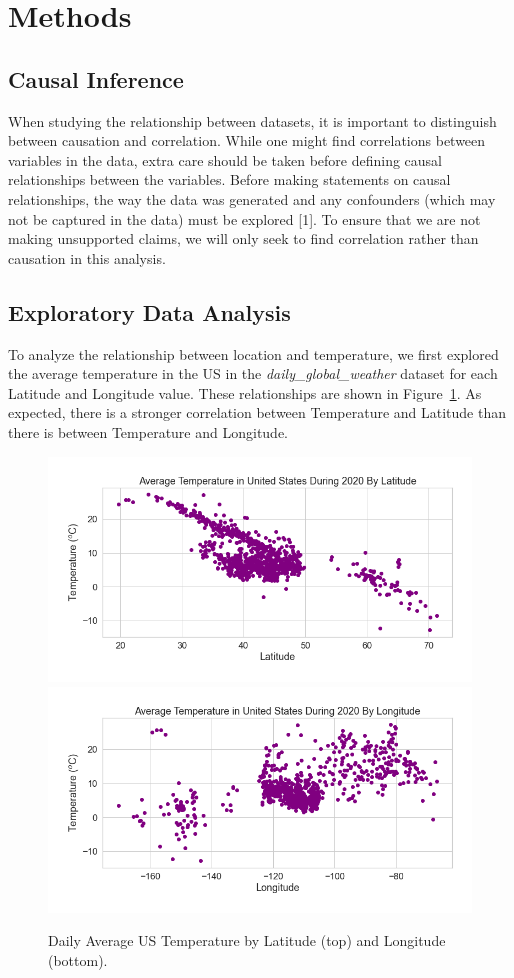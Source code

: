 \section{Methods}
\subsection{Causal Inference}
When studying the relationship between datasets, it is important to distinguish between causation and correlation. While one might find correlations between variables in the data, extra care should be taken before defining causal relationships between the variables. Before making statements on causal relationships, the way the data was generated and any confounders (which may not be captured in the data) must be explored [1]. To ensure that we are not making unsupported claims, we will only seek to find correlation rather than causation in this analysis. 

\subsection{Exploratory Data Analysis}
To analyze the relationship between location and temperature, we first explored the average temperature in the US in the \textit{daily\_global\_weather} dataset for each Latitude and Longitude value. These relationships are shown in Figure~\ref{fig:latlon_temp}. As expected, there is a stronger correlation between Temperature and Latitude than there is between Temperature and Longitude.
\begin{figure}
    \centering
    \includegraphics[width=\columnwidth]{figures/USLatTemp.png}
    \includegraphics[width=\columnwidth]{figures/USLonTemp.png}
    \caption{Daily Average US Temperature by Latitude (top) and Longitude (bottom).}
    \label{fig:latlon_temp}
\end{figure}


